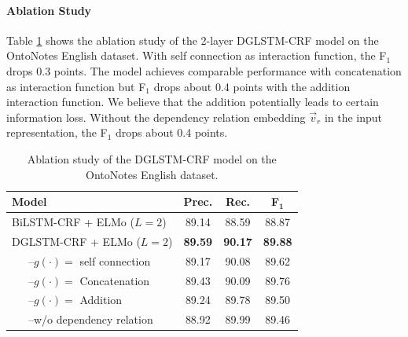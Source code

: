 \paragraph{Ablation Study}
Table \ref{tab:dglstmablation} shows the ablation study of the 2-layer DGLSTM-CRF model on the OntoNotes English dataset.
With self connection as interaction function, the F$_1$ drops 0.3 points.
The model achieves comparable performance with concatenation as interaction function but  F$_1$ drops about 0.4 points with the addition interaction function.  
We believe that the addition potentially leads to certain information loss.
Without the dependency relation embedding $\vec{v}_r$ in the input representation, the F$_1$ drops about 0.4 points.
\begin{table}[h!]
	\centering
	\begin{tabular}{lccc}
		\toprule
		\textbf{Model}&  \textbf{Prec.} & \textbf{Rec.} & \textbf{F}$_\mathbf{1}$\\
		\midrule
		BiLSTM-CRF + {\footnotesize ELMo ($L=2$)}  & 89.14& 88.59 & 88.87 \\
		\cdashlinelr{1-4}
		DGLSTM-CRF  + {\footnotesize ELMo ($L=2$)}  & \textbf{89.59}& \textbf{90.17} & \textbf{89.88} \\
		~~~--$g(\cdot) = $ self connection & 89.17 &90.08  &89.62   \\
		~~~--$g(\cdot) = $ Concatenation & 89.43 & 90.09 & 89.76  \\
		~~~--$g(\cdot) = $ Addition & 89.24&89.78 & 89.50\\
		~~~--w/o dependency relation & 88.92 & 89.99 & 89.46 \\
		\bottomrule
	\end{tabular}
	\caption{Ablation study of the DGLSTM-CRF model on the OntoNotes English dataset.}
	\label{tab:dglstmablation}
\end{table}







